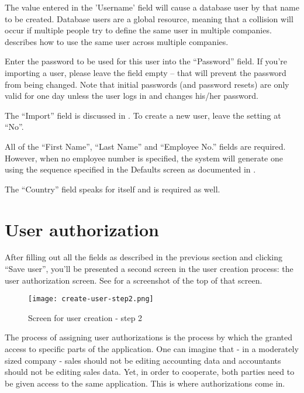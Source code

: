 The value entered in the 'Username' field will cause a database user by that name
to be created. Database users are a global resource, meaning that a collision will
occur if multiple people try to define the same user in multiple companies.
 describes how to use the same user across multiple companies.

Enter the password to be used for this user into the ``Password'' field. If you're
importing a user, please leave the field empty -- that will prevent the password
from being changed.  Note that initial passwords  (and password resets) are only 
valid for one day unless the user logs in and changes his/her password.

The ``Import'' field is discussed in . To create a new
user, leave the setting at ``No''.

All of the ``First Name'', ``Last Name'' and ``Employee No.'' fields are required.
However, when no employee number is specified, the system will generate one using
the sequence specified in the Defaults screen as documented in
.

The ``Country'' field speaks for itself and is required as well.


\section{User authorization}
\label{sec-user-management-authorization}

After filling out all the fields as described in the previous section and
clicking ``Save user'', you'll be presented
a second screen in the user creation process: the user authorization screen.
See  for a screenshot of the top of that screen.

\begin{figure}[h]
\texttt{[image: create-user-step2.png]}
\caption{Screen for user creation - step 2}
\label{fig:create-user-step2}
\end{figure}


The process of assigning user authorizations is the process by which the granted
access to specific parts of the application. One can imagine that - in a moderately
sized company - sales should not be editing accounting data and accountants should
not be editing sales data. Yet, in order to cooperate, both parties need to be
given access to the same application. This is where authorizations come in.

